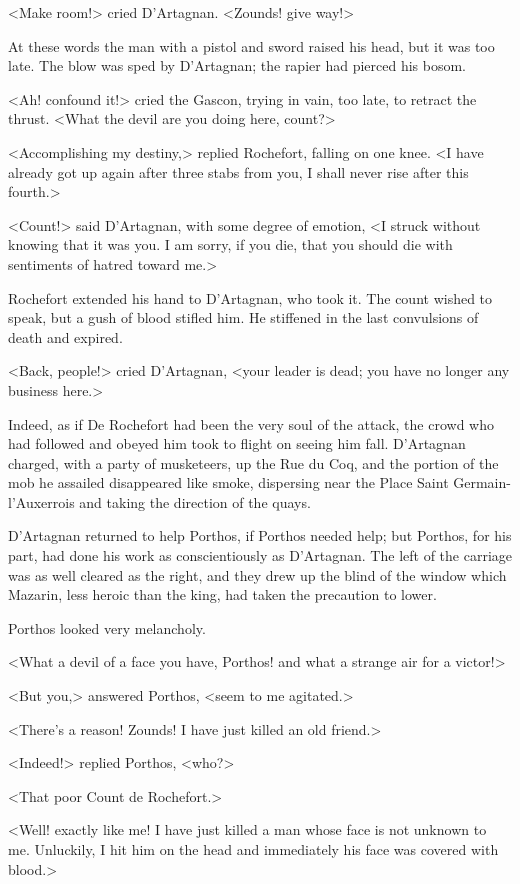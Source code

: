 <Make room!> cried D'Artagnan. <Zounds! give way!>

At these words the man with a pistol and sword raised his head, but it was too late. The blow was sped by D'Artagnan; the rapier had pierced his bosom.

<Ah! confound it!> cried the Gascon, trying in vain, too late, to retract the thrust. <What the devil are you doing here, count?>

<Accomplishing my destiny,> replied Rochefort, falling on one knee. <I have already got up again after three stabs from you, I shall never rise after this fourth.>

<Count!> said D'Artagnan, with some degree of emotion, <I struck without knowing that it was you. I am sorry, if you die, that you should die with sentiments of hatred toward me.>

Rochefort extended his hand to D'Artagnan, who took it. The count wished to speak, but a gush of blood stifled him. He stiffened in the last convulsions of death and expired.

<Back, people!> cried D'Artagnan, <your leader is dead; you have no longer any business here.>

Indeed, as if De Rochefort had been the very soul of the attack, the crowd who had followed and obeyed him took to flight on seeing him fall. D'Artagnan charged, with a party of musketeers, up the Rue du Coq, and the portion of the mob he assailed disappeared like smoke, dispersing near the Place Saint Germain-l'Auxerrois and taking the direction of the quays.

D'Artagnan returned to help Porthos, if Porthos needed help; but Porthos, for his part, had done his work as conscientiously as D'Artagnan. The left of the carriage was as well cleared as the right, and they drew up the blind of the window which Mazarin, less heroic than the king, had taken the precaution to lower.

Porthos looked very melancholy.

<What a devil of a face you have, Porthos! and what a strange air for a victor!>

<But you,> answered Porthos, <seem to me agitated.>

<There's a reason! Zounds! I have just killed an old friend.>

<Indeed!> replied Porthos, <who?>

<That poor Count de Rochefort.>

<Well! exactly like me! I have just killed a man whose face is not unknown to me. Unluckily, I hit him on the head and immediately his face was covered with blood.>

